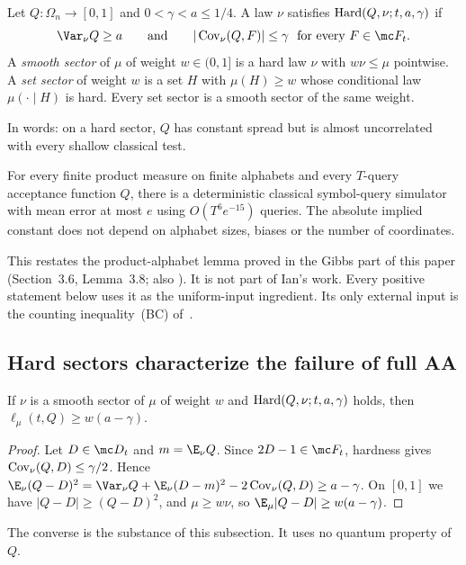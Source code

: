 \begin{definition}\label{dist:hard}
Let \(Q:\Omega_n\to[0,1]\) and \(0<\gamma<a\le1/4\). A law \(\nu\) satisfies
\(\operatorname{Hard}(Q,\nu;t,a,\gamma)\) if
\[
 \Var_\nu Q\ge a
 \qquad\text{and}\qquad
 |\Cov_\nu(Q,F)|\le\gamma\ \text{ for every }F\in\mc F_t .
\]
A \emph{smooth sector} of \(\mu\) of weight \(w\in(0,1]\) is a hard law \(\nu\)
with \(w\nu\le\mu\) pointwise. A \emph{set sector} of weight \(w\) is a set
\(H\) with \(\mu(H)\ge w\) whose conditional law \(\mu(\cdot\mid H)\) is hard.
Every set sector is a smooth sector of the same weight.
\end{definition}
In words: on a hard sector, \(Q\) has constant spread but is almost
uncorrelated with every shallow classical test.

\begin{theorem}\label{dist:product-sim}
For every finite product measure on finite alphabets and every \(T\)-query
acceptance function \(Q\), there is a deterministic classical symbol-query
simulator with mean error at most \(e\) using \(O(T^6e^{-15})\) queries. The
absolute implied constant does not depend on alphabet sizes, biases or the
number of coordinates.
\end{theorem}
This restates the product-alphabet lemma proved in the Gibbs part of this
paper (Section~3.6, Lemma~3.8; also
). It is not part of Ian's work.
Every positive statement below uses it as the uniform-input ingredient. Its only
external input is the counting inequality~(BC) of~\cite{HMP26}.

\subsection{Hard sectors characterize the failure of full AA}\label{dist:sectors}

\begin{proposition}\label{dist:forward}
If \(\nu\) is a smooth sector of \(\mu\) of weight \(w\) and
\(\operatorname{Hard}(Q,\nu;t,a,\gamma)\) holds, then \(\ell_\mu(t,Q)\ge w(a-\gamma)\).
\end{proposition}
\begin{proof}
Let \(D\in\mc D_t\) and \(m=\E_\nu Q\). Since \(2D-1\in\mc F_t\), hardness gives
\(\operatorname{Cov}_\nu(Q,D)\le\gamma/2\). Hence
\(\E_\nu(Q-D)^2=\Var_\nu Q+\E_\nu(D-m)^2-2\Cov_\nu(Q,D)\ge a-\gamma\). On
\([0,1]\) we have \(|Q-D|\ge(Q-D)^2\), and \(\mu\ge w\nu\), so
\(\E_\mu|Q-D|\ge w(a-\gamma)\).
\end{proof}
The converse is the substance of this subsection. It uses no quantum property
of \(Q\).


